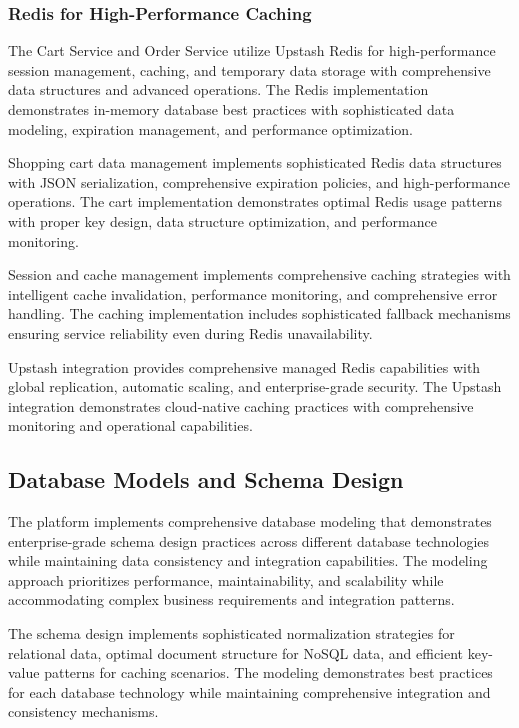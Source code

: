 \subsubsection{Redis for High-Performance Caching}

The Cart Service and Order Service utilize Upstash Redis for high-performance session management, caching, and temporary data storage with comprehensive data structures and advanced operations. The Redis implementation demonstrates in-memory database best practices with sophisticated data modeling, expiration management, and performance optimization.

Shopping cart data management implements sophisticated Redis data structures with JSON serialization, comprehensive expiration policies, and high-performance operations. The cart implementation demonstrates optimal Redis usage patterns with proper key design, data structure optimization, and performance monitoring.

Session and cache management implements comprehensive caching strategies with intelligent cache invalidation, performance monitoring, and comprehensive error handling. The caching implementation includes sophisticated fallback mechanisms ensuring service reliability even during Redis unavailability.

Upstash integration provides comprehensive managed Redis capabilities with global replication, automatic scaling, and enterprise-grade security. The Upstash integration demonstrates cloud-native caching practices with comprehensive monitoring and operational capabilities.

\subsection{Database Models and Schema Design}

The platform implements comprehensive database modeling that demonstrates enterprise-grade schema design practices across different database technologies while maintaining data consistency and integration capabilities. The modeling approach prioritizes performance, maintainability, and scalability while accommodating complex business requirements and integration patterns.

The schema design implements sophisticated normalization strategies for relational data, optimal document structure for NoSQL data, and efficient key-value patterns for caching scenarios. The modeling demonstrates best practices for each database technology while maintaining comprehensive integration and consistency mechanisms.

